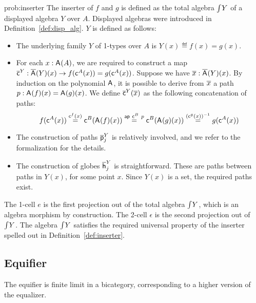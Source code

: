 \begin{construction}{prob:inserter}\label{cons:inserter}
The inserter of $f$ and $g$ is defined as the total algebra $\textstyle \int_{}{Y}$ of a
displayed algebra $Y$ over $A$. Displayed algebras were
introduced in Definition~\ref{def:disp_alg}. $Y$ is defined as follows:
\begin{itemize}
\item The underlying family $Y$ of 1-types over $A$ is $Y(x) \eqdef f(x) = g(x)$.
\item
For each $x : \mathsf{A}^{}(A)$, we are required to construct
a map $\overline{\mathsf{c}}^{Y} : \overline{\mathsf{A}^{}}(Y)(x) \rightarrow
f(\mathsf{c}^{A}(x)) = g (\mathsf{c}^{A}(x))$. Suppose we have $\overline{x}
: \overline{\mathsf{A}^{}}(Y)(x)$. By induction on the polynomial
$\mathsf{A}^{}$, it is possible to derive from $\overline{x}$ a path $p
: \mathsf{A}^{}(f)(x) = \mathsf{A}^{}(g)(x)$.  We
define $\overline{\mathsf{c}}^{Y}(\overline{x})$ as the following concatenation of paths:
\[
f(\mathsf{c}^{A}(x))
\stackrel{\mathsf{c}^{f}(x)}{=} \mathsf{c}^{B}(\mathsf{A}^{}(f)(x))
\stackrel{\mathsf{ap} \ \mathsf{c}^{B} \ p}{=} \mathsf{c}^{B}(\mathsf{A}^{}(g)(x))
\stackrel{(\mathsf{c}^{g}(x))^{-1}}{=} g (\mathsf{c}^{A}(x))
\]
\item The construction of paths $\overline{\mathsf{p}}^{Y}_{j}$ is relatively involved, and we refer to the formalization for the details.
\item
The construction of globes $\overline{\mathsf{h}}^{Y}_{j}$ is
straightforward. These are paths between paths in $Y(x)$, for some
point $x$. Since $Y(x)$ is a set, the required paths exist.
\end{itemize}

The 1-cell $e$ is the first projection out of the total algebra
$\textstyle \int_{}{Y}$, which is an algebra morphism by construction. The
2-cell $\epsilon$ is the second projection out of $\textstyle \int_{}{Y}$. The
algebra $\textstyle \int_{}{Y}$ satisfies the required universal property of the
inserter spelled out in Definition~\ref{def:inserter}.
\end{construction}

\subsection{Equifier}

The equifier is finite limit in a bicategory, corresponding to a
higher version of the equalizer.


